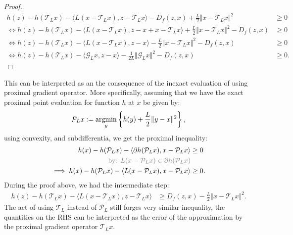 \documentclass[12pt]{article}
\begin{document}
\begin{proof}
        \begin{align*}
            h(z) - h(\mathcal T_L x)
            - \langle L(x - \mathcal T_L x) , z - \mathcal T_L x\rangle
            - D_f(z, x)
            + \frac{L}{2}\Vert x - \mathcal T_L x\Vert^2
            &\ge 0
            \\
            \iff 
            h(z) - h (\mathcal T_L x)
            - \langle L(x - \mathcal T_L x), z - x + x - \mathcal T_L x\rangle
            + \frac{L}{2}\Vert x - \mathcal T_L x\Vert^2
            - D_f(z, x)
            &\ge 0
            \\
            \iff 
            h(z) - h (\mathcal T_L x)
            - \langle L(x - \mathcal T_L x), z - x\rangle
            - \frac{L}{2}\Vert x - \mathcal T_L x\Vert^2
            - D_f(z, x)
            &\ge 0
            \\
            \iff 
            h(z) - h (\mathcal T_L x)
            - \langle \mathcal G_L x, z - x\rangle
            - \frac{1}{2L}\Vert \mathcal G_L x\Vert^2
            - D_f(z, x)
            &\ge 0. 
        \end{align*}
    \end{proof}
    \begin{observation}
        This can be interpreted as an the consequence of the inexact evaluation of using proximal gradient operator. 
        More specifically, assuming that we have the exact proximal point evaluation for function $h$ at $x$ be given by: 
        \begin{align*}
            \mathcal P_L x := \mathop{\rm argmin}\limits_{y}\left\lbrace
                h(y) + \frac{L}{2}\Vert  y- x\Vert^2
            \right\rbrace, 
        \end{align*}
        using convexity, and subdifferentia, we get the proximal inequality: 
        \begin{align*}
            h(x) - h(\mathcal P_Lx) 
            - \langle \partial h(\mathcal P_L x), x - \mathcal P_L x\rangle
            &\ge 
            0
            \\
            \textcolor{gray}{
                \text{by: }
                L(x - \mathcal P_L x) \in \partial h(\mathcal P_L x)
            }&
            \\
            \implies 
            h(x) - h(\mathcal P_Lx) 
            - \langle L(x - \mathcal P_L x), x - \mathcal P_L x\rangle
            &\ge 0. 
        \end{align*}
        During the proof above, we had the intermediate step: 
        \begin{align*}
            h(z) - h(\mathcal T_L x) 
            - \langle
                L(x - \mathcal T_L x), 
                z - \mathcal T_L x
            \rangle 
            &\ge 
            D_f(z, x) - \frac{L}{2}\Vert x - \mathcal T_L x\Vert^2. 
        \end{align*}
        The act of using $\mathcal T_L$ instead of $\mathcal P_L$ still forges very similar inequality, the quantities on the RHS can be interpreted as the error of the approximation by the proximal gradient operator $\mathcal T_L x$. 
    \end{observation}
\end{document}
